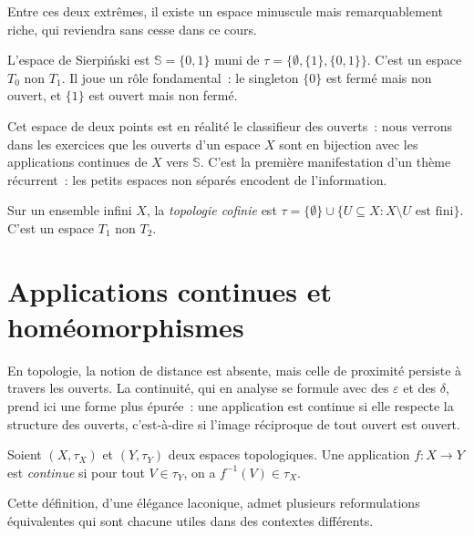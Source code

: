 Entre ces deux extr\^emes, il existe un espace minuscule mais
remarquablement riche, qui reviendra sans cesse dans ce cours.

\begin{exemple}\label{ex:sierpinski}
L'espace de Sierpi\'nski est $\mathbb{S} = \{0,1\}$ muni de $\tau = \{\emptyset, \{1\},
\{0,1\}\}$. C'est un espace $T_0$ non $T_1$. Il joue un r\^ole fondamental~: le singleton
$\{0\}$ est ferm\'e mais non ouvert, et $\{1\}$ est ouvert mais non ferm\'e.
\end{exemple}

Cet espace de deux points est en r\'ealit\'e le \og classifieur des
ouverts\fg~: nous verrons dans les exercices que les ouverts d'un espace
$X$ sont en bijection avec les applications continues de $X$ vers
$\mathbb{S}$. C'est la premi\`ere manifestation d'un th\`eme r\'ecurrent~: les
petits espaces non s\'epar\'es encodent de l'information.

\begin{exemple}
Sur un ensemble infini $X$, la \emph{topologie cofinie} est
$\tau = \{\emptyset\} \cup \{U \subseteq X : X \setminus U \text{ est fini}\}$.
C'est un espace $T_1$ non $T_2$.
\end{exemple}

\section{Applications continues et hom\'eomorphismes}

En topologie, la notion de distance est absente, mais celle de
\og proximit\'e\fg{} persiste \`a travers les ouverts. La continuit\'e, qui en
analyse se formule avec des $\varepsilon$ et des $\delta$, prend ici une
forme plus \'epur\'ee~: une application est continue si elle respecte la
structure des ouverts, c'est-\`a-dire si l'image r\'eciproque de tout ouvert
est ouvert.

\begin{definition}
Soient $(X,\tau_X)$ et $(Y,\tau_Y)$ deux espaces topologiques. Une application
$f\colon X \to Y$ est \emph{continue} si pour tout $V \in \tau_Y$, on a
$f^{-1}(V) \in \tau_X$.
\end{definition}

Cette d\'efinition, d'une \'el\'egance laconique, admet plusieurs
reformulations \'equivalentes qui sont chacune utiles dans des contextes
diff\'erents.

